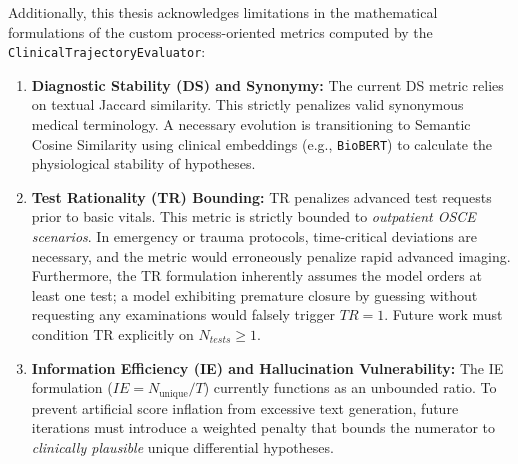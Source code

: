 Additionally, this thesis acknowledges limitations in the mathematical formulations of the custom process-oriented metrics computed by the \texttt{ClinicalTrajectoryEvaluator}:
\begin{enumerate}
    \item \textbf{Diagnostic Stability (DS) and Synonymy:} The current DS metric relies on textual Jaccard similarity. This strictly penalizes valid synonymous medical terminology. A necessary evolution is transitioning to Semantic Cosine Similarity using clinical embeddings (e.g., \texttt{BioBERT}) to calculate the physiological stability of hypotheses.
    \item \textbf{Test Rationality (TR) Bounding:} TR penalizes advanced test requests prior to basic vitals. This metric is strictly bounded to \textit{outpatient OSCE scenarios}. In emergency or trauma protocols, time-critical deviations are necessary, and the metric would erroneously penalize rapid advanced imaging. Furthermore, the TR formulation inherently assumes the model orders at least one test; a model exhibiting premature closure by guessing without requesting any examinations would falsely trigger $TR = 1$. Future work must condition TR explicitly on $N_{tests} \geq 1$.
    \item \textbf{Information Efficiency (IE) and Hallucination Vulnerability:} The IE formulation ($IE = N_{\text{unique}}/T$) currently functions as an unbounded ratio. To prevent artificial score inflation from excessive text generation, future iterations must introduce a weighted penalty that bounds the numerator to \textit{clinically plausible} unique differential hypotheses.
\end{enumerate}
